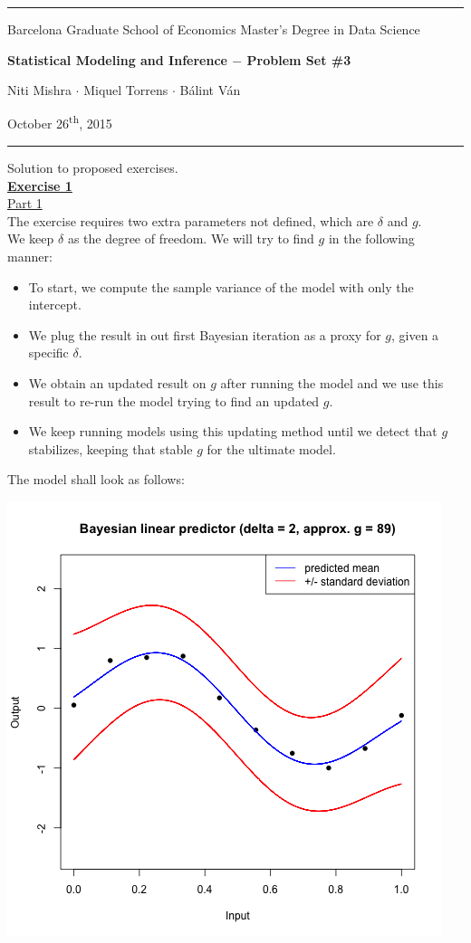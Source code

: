 \documentclass[a4paper, 11pt]{article}
\newcommand{\header}[4]{
	\begin{center}
		\rule{\linewidth}{0.5pt}
		
		{\small{#1}}
      
        \vspace{0.2in}
        
		{\large{#2}}
		
        \vspace{0.2in}
        
		{\small{#3}}
		
		\vspace{0.15in}
		
		{#4}
		
		\vspace{-0.1in}
		\rule{\linewidth}{0.6pt}
	\end{center}
}
\begin{document}
 
\header{\sc Barcelona Graduate School of Economics \hfill Master's Degree in Data Science}{\bf Statistical Modeling and Inference $-$ Problem Set \#3}{\sc Niti Mishra $\cdot$ Miquel Torrens $\cdot$ B\'alint V\'an}{October 26\textsuperscript{th}, 2015}
Solution to proposed exercises.\\
\newline \textbf{\underline{Exercise 1}}\\
\newline \underline{Part 1}\\
\newline The exercise requires two extra parameters not defined, which are $\delta$ and $g$.\\
\newline We keep $\delta$ as the degree of freedom. We will try to find $g$ in the following manner:
\begin{itemize}
\item To start, we compute the sample variance of the model with only the intercept.
\item We plug the result in out first Bayesian iteration as a proxy for $g$, given a specific $\delta$.
\item We obtain an updated result on $g$ after running the model and we use this result to re-run the model  trying to find an updated $g$.
\item We keep running models using this updating method until we detect that $g$ stabilizes, keeping that stable $g$ for the ultimate model.
\end{itemize}
The model shall look as follows:\\
\begin{center}
\includegraphics[scale=0.6]{ps3F_plot1.png}
\end{center}
\end{document}
